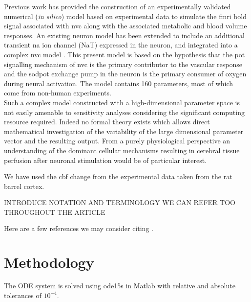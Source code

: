 \documentclass[12pt]{article}
\numberwithin{equation}{section}
\begin{document}
Previous work \cite{Mathias2018} has provided  the construction of an experimentally validated numerical (\textit{in silico}) model based on experimental data to simulate the \gls{fmri} \gls{bold} signal associated with \gls{nvc} along with the associated metabolic and blood volume responses. An existing neuron model \citep{Mathias2017, Mathias2017a} has been extended to include an additional transient \gls{na} ion channel (NaT) expressed in the neuron, and integrated into a complex \gls{nvc} model \citep{Dormanns2015, Dormanns2016, Kenny2017a}. This present model is based on the hypothesis that the \gls{pot} signalling mechanism of \gls{nvc} is the primary contributor to the vascular response and the \gls{sodpot} exchange pump in the neuron is the primary consumer of oxygen during neural activation. The model contains 160 parameters, most of which come from non-human experiments. \\
Such a complex model constructed with a high-dimensional parameter space is not easily amenable to sensitivity analyses considering the significant computing resource required. Indeed no formal theory exists which allows direct mathematical investigation of the variability of the large dimensional parameter vector and the resulting output. 
From a purely physiological perspective an understanding of the dominant cellular mechanisms resulting in cerebral tissue perfusion after neuronal stimulation would be of particular interest.
  
  We have used the \gls{cbf} change from the experimental data \cite{Zheng2010} taken from the rat barrel cortex. 
  
 INTRODUCE NOTATION AND TERMINOLOGY WE CAN REFER TOO THROUGHOUT THE ARTICLE
  
Here are a few references we may consider citing  \cite{gsa_pharm,lr_gsa,uqpy}.
  
\section{Methodology}
The ODE system is solved using ode15s in Matlab with relative and absolute tolerances of $10^{-4}$.
\end{document}
